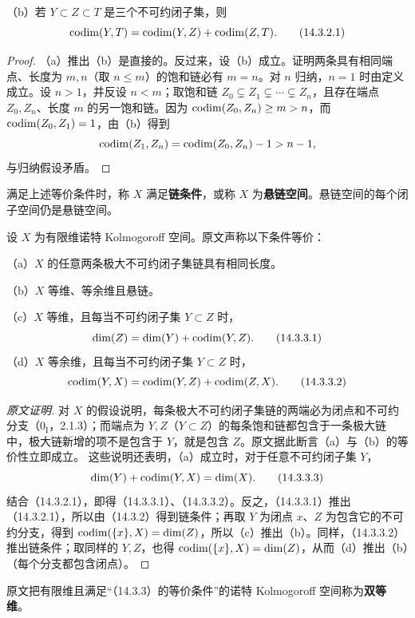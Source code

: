 （b）若 $Y\subset Z\subset T$ 是三个不可约闭子集，则
\begin{equation}
 \operatorname{codim}(Y,T)=\operatorname{codim}(Y,Z)+\operatorname{codim}(Z,T).\tag{14.3.2.1}
\end{equation}
\begin{proof}
（a）推出（b）是直接的。反过来，设（b）成立。证明两条具有相同端点、长度为 $m,n$（取 $n\leq m$）的饱和链必有 $m=n$。对 $n$ 归纳，$n=1$ 时由定义成立。设 $n>1$，并反设 $n<m$；取饱和链
$Z_0\subsetneq Z_1\subsetneq\cdots\subsetneq Z_n$，且存在端点 $Z_0,Z_n$、长度 $m$ 的另一饱和链。因为 $\operatorname{codim}(Z_0,Z_n)\geq m>n$，而 $\operatorname{codim}(Z_0,Z_1)=1$，由（b）得到
\[
 \operatorname{codim}(Z_1,Z_n)=\operatorname{codim}(Z_0,Z_n)-1>n-1,
\]
与归纳假设矛盾。
\end{proof}
满足上述等价条件时，称 $X$ 满足\textbf{链条件}，或称 $X$ 为\textbf{悬链空间}。悬链空间的每个闭子空间仍是悬链空间。

设 $X$ 为有限维诺特 Kolmogoroff 空间。原文声称以下条件等价：

（a）$X$ 的任意两条极大不可约闭子集链具有相同长度。

（b）$X$ 等维、等余维且悬链。

（c）$X$ 等维，且每当不可约闭子集 $Y\subset Z$ 时，
\begin{equation}\dim(Z)=\dim(Y)+\operatorname{codim}(Y,Z).\tag{14.3.3.1}\end{equation}
（d）$X$ 等余维，且每当不可约闭子集 $Y\subset Z$ 时，
\begin{equation}\operatorname{codim}(Y,X)=\operatorname{codim}(Y,Z)+\operatorname{codim}(Z,X).\tag{14.3.3.2}\end{equation}
\begin{proof}[原文证明]
对 $X$ 的假设说明，每条极大不可约闭子集链的两端必为闭点和不可约分支（$0_{\mathrm I}$，2.1.3）；而端点为 $Y,Z$（$Y\subset Z$）的每条饱和链都包含于一条极大链中，极大链新增的项不是包含于 $Y$，就是包含 $Z$。原文据此断言（a）与（b）的等价性立即成立。
这些说明还表明，（a）成立时，对于任意不可约闭子集 $Y$，
\begin{equation}\dim(Y)+\operatorname{codim}(Y,X)=\dim(X).\tag{14.3.3.3}\end{equation}
结合（14.3.2.1），即得（14.3.3.1）、（14.3.3.2）。反之，（14.3.3.1）推出（14.3.2.1），所以由（14.3.2）得到链条件；再取 $Y$ 为闭点 $x$、$Z$ 为包含它的不可约分支，得到 $\operatorname{codim}(\{x\},X)=\dim(Z)$，所以（c）推出（b）。同样，（14.3.3.2）推出链条件；取同样的 $Y,Z$，也得 $\operatorname{codim}(\{x\},X)=\dim(Z)$，从而（d）推出（b）（每个分支都包含闭点）。
\end{proof}
原文把有限维且满足“（14.3.3）的等价条件”的诺特 Kolmogoroff 空间称为\textbf{双等维}。

